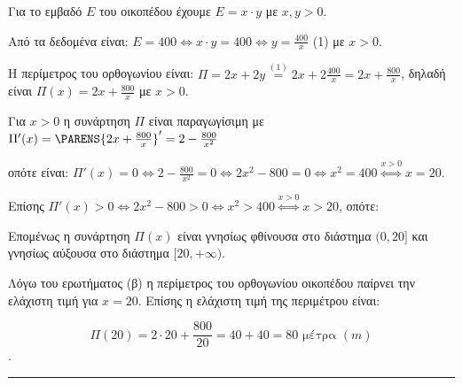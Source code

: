 \begin{alist}
\item Για το εμβαδό $E$ του οικοπέδου έχουμε $E = x \cdot y$ με $x, y > 0$.

Από τα δεδομένα είναι: $E = 400 \Leftrightarrow x \cdot y = 400 \Leftrightarrow y = \frac{400}{x}$ (1) με $x > 0$.

Η περίμετρος του ορθογωνίου είναι: $\Pi = 2x + 2y \stackrel{(1)}{=} 2x + 2\frac{400}{x} = 2x + \frac{800}{x}$, δηλαδή είναι $\Pi(x) = 2x + \frac{800}{x}$ με $x > 0$.

\item Για $x > 0$ η συνάρτηση $\Pi$ είναι παραγωγίσιμη με $\Pi'(x) = \PARENS{2x + \frac{800}{x}}' = 2 - \frac{800}{x^2}$

οπότε είναι: $\Pi'(x) = 0 \Leftrightarrow 2 - \frac{800}{x^2} = 0 \Leftrightarrow 2x^2 - 800 = 0 \Leftrightarrow x^2 = 400 \stackrel{x>0}{\Leftrightarrow} x = 20$.

Επίσης $\Pi'(x) > 0 \Leftrightarrow 2x^2 - 800 > 0 \Leftrightarrow x^2 > 400 \stackrel{x>0}{\Leftrightarrow} x > 20$, οπότε:

\begin{center}
\end{center}

Επομένως η συνάρτηση $\Pi(x)$ είναι γνησίως φθίνουσα στο διάστημα $(0, 20]$ και γνησίως αύξουσα στο διάστημα $[20, +\infty)$.

\item Λόγω του ερωτήματος (β) η περίμετρος του ορθογωνίου οικοπέδου παίρνει την ελάχιστη τιμή για $x = 20$. Επίσης η ελάχιστη τιμή της περιμέτρου είναι:

\[ \Pi(20) = 2 \cdot 20 + \frac{800}{20} = 40 + 40 = 80 \text{ μέτρα } (m) \].
\end{alist}
\vspace{6mm}
\noindent\rule{\textwidth}{0.4pt}
\vspace{6mm}

